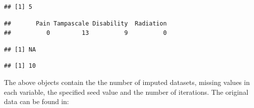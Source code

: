 \documentclass[]{book}
\newenvironment{Shaded}{\begin{snugshade}}{\end{snugshade}}
\newcommand{\OperatorTok}[1]{\textcolor[rgb]{0.81,0.36,0.00}{\textbf{#1}}}
\newcommand{\NormalTok}[1]{#1}
\begin{document}
\begin{verbatim}
## [1] 5
\end{verbatim}

\begin{Shaded}
\end{Shaded}

\begin{verbatim}
##       Pain Tampascale Disability  Radiation 
##          0         13          9          0
\end{verbatim}

\begin{Shaded}
\end{Shaded}

\begin{verbatim}
## [1] NA
\end{verbatim}

\begin{Shaded}
\end{Shaded}

\begin{verbatim}
## [1] 10
\end{verbatim}

The above objects contain the the number of imputed datasets, missing
values in each variable, the specified seed value and the number of
iterations. The original data can be found in:

\begin{Shaded}
\end{Shaded}
\end{document}
